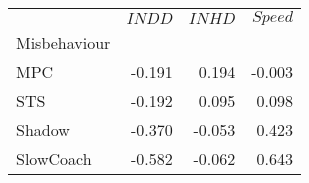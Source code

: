 \begin{tabular}{lrrr}
\toprule
{} &  $INDD$ &  $INHD$ &  $Speed$ \\
Misbehaviour &         &         &          \\
\midrule
MPC          &  -0.191 &   0.194 &   -0.003 \\
STS          &  -0.192 &   0.095 &    0.098 \\
Shadow       &  -0.370 &  -0.053 &    0.423 \\
SlowCoach    &  -0.582 &  -0.062 &    0.643 \\
\bottomrule
\end{tabular}
